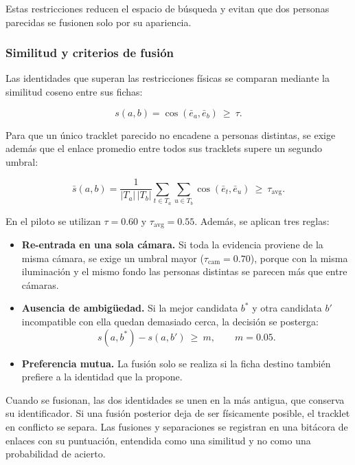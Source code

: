 \documentclass[12pt,a4paper]{article}
\begin{document}
Estas restricciones reducen el espacio de búsqueda y evitan que dos
personas parecidas se fusionen solo por su apariencia.

\subsubsection{Similitud y criterios de fusión}

Las identidades que superan las restricciones físicas se comparan
mediante la similitud coseno entre sus fichas:

\begin{equation}
s(a,b)=\cos\!\left(\bar{e}_a,\bar{e}_b\right)\ \geq\ \tau .
\end{equation}

Para que un único tracklet parecido no encadene a personas distintas, se
exige además que el enlace promedio entre todos sus tracklets supere un
segundo umbral:

\begin{equation}
\bar{s}(a,b)=
\frac{1}{|T_a|\,|T_b|}
\sum_{t\in T_a}\sum_{u\in T_b}
\cos\!\left(\bar{e}_t,\bar{e}_u\right)
\ \geq\ \tau_{\text{avg}} .
\end{equation}

En el piloto se utilizan $\tau=0.60$ y $\tau_{\text{avg}}=0.55$. Además,
se aplican tres reglas:

\begin{itemize}
    \item \textbf{Re-entrada en una sola cámara.} Si toda la evidencia
    proviene de la misma cámara, se exige un umbral mayor
    ($\tau_{\text{cam}}=0.70$), porque con la misma iluminación y el
    mismo fondo las personas distintas se parecen más que entre cámaras.
    \item \textbf{Ausencia de ambigüedad.} Si la mejor candidata $b^{*}$ y
    otra candidata $b'$ incompatible con ella quedan demasiado cerca, la
    decisión se posterga:
    \begin{equation}
    s(a,b^{*})-s(a,b')\ \geq\ m, \qquad m=0.05 .
    \end{equation}
    \item \textbf{Preferencia mutua.} La fusión solo se realiza si la
    ficha destino también prefiere a la identidad que la propone.
\end{itemize}

Cuando se fusionan, las dos identidades se unen en la más antigua, que
conserva su identificador. Si una fusión posterior deja de ser
físicamente posible, el tracklet en conflicto se separa. Las fusiones y
separaciones se registran en una bitácora de enlaces con su puntuación,
entendida como una similitud y no como una probabilidad de acierto.
\end{document}
